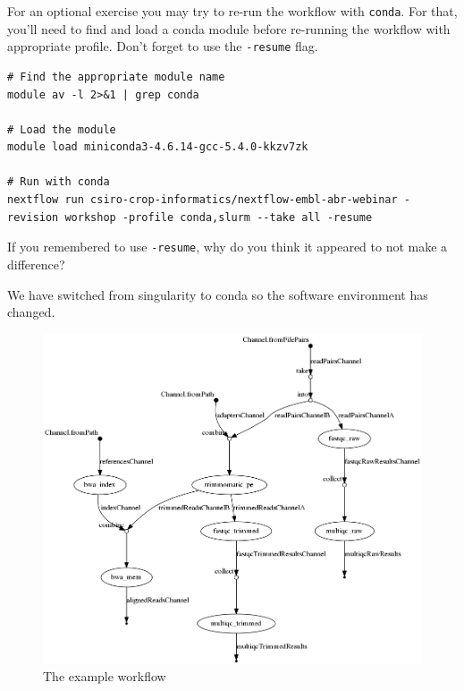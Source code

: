 \begin{bonus}
For an optional exercise you may try to re-run the workflow with \texttt{conda}.
For that, you'll need to find and load a conda module before re-running the workflow with appropriate profile. Don't forget to use the \texttt{-resume} flag.
\begin{answer}
\begin{lstlisting}
# Find the appropriate module name
module av -l 2>&1 | grep conda

# Load the module
module load miniconda3-4.6.14-gcc-5.4.0-kkzv7zk

# Run with conda
nextflow run csiro-crop-informatics/nextflow-embl-abr-webinar -revision workshop -profile conda,slurm --take all -resume

\end{lstlisting}
\end{answer}

If you remembered to use \texttt{-resume}, why do you think it appeared to not make a difference?

\begin{answer}
We have switched from singularity to conda so the software environment has changed. 
\end{answer}


\end{bonus}


\begin{figure}[H]
\centering
\includegraphics[width=\textwidth]{handout/flowchart.png}
\caption{The example workflow}
\label{fig:dag}
\end{figure}


